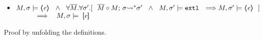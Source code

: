\documentclass[acmsmall,review,anonymous,screen]{acmart}\settopmatter{printfolios=true,printacmref=false}
\begin{document}
\begin{lemma}
$~ $ \\
\label{lemma:inside:implies:noCalls}
\begin{itemize}

\item
$\satisfiesA{M}{\sigma} {\inside {\re} } %
 \ \ \wedge\ \ \forall \Mtwo.\forall \sigma'.[\ \ 
 \leadstoBoundedStar  {\Mtwo\circ M} {\sigma} {\sigma'}\ \ \wedge \ \ \satisfiesA{M}{\sigma'} {\extThis} \ \ \Longrightarrow \satisfiesA{M}{\sigma'} {\inside {\re}}  \ \ ]
 $
 \\
 $\strut \hspace{1cm} \Longrightarrow \ \ \  M, \sigma \models \  [\!\![ \mathit{e} ]\!\!]$

\end{itemize}
\end{lemma}

Proof by unfolding the definitions. 
 
\end{document}
